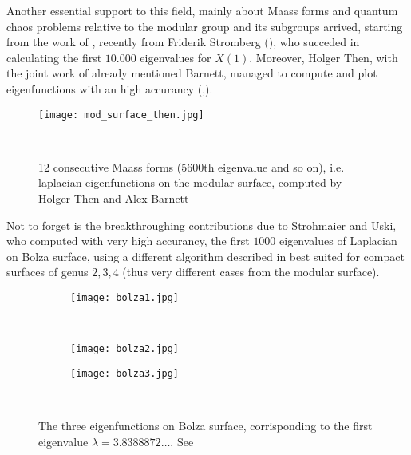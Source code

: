 Another essential support to this field, mainly about Maass forms and quantum chaos problems relative to the modular group and its subgroups arrived, starting from the work of \cite{Hejhal:triang}, recently from Friderik Stromberg (\cite{Stromb:article}), who succeded in calculating the first $10.000$ eigenvalues for $X(1)$. Moreover, Holger Then, with the joint work of already mentioned Barnett, managed to compute and plot eigenfunctions with an high accurancy (\cite{Barnett:asym_rate},\cite{Then:article}).



\begin{figure}[H]
\centering

    \texttt{[image: mod\_surface\_then.jpg]}

  \noindent\\

  \decoRule
  \caption{12 consecutive Maass forms (5600th eigenvalue and so on), i.e. laplacian eigenfunctions on the modular surface, computed by Holger Then and Alex Barnett}
  \label{fig:holg_then_eig_modul}
\end{figure}







Not to forget is the breakthroughing contributions due to Strohmaier and Uski, who computed with very high accurancy, the first $1000$ eigenvalues of Laplacian on Bolza surface, using a different algorithm described in \cite{Stroh:comput} best suited for compact surfaces of genus $2,3,4$ (thus very different cases from the modular surface).


\begin{figure}[H]
\centering
  \begin{subfigure}[b]{0.2\textwidth}
  \centering
    \texttt{[image: bolza1.jpg]}
    \label{fig:eig_bolza1}
  \end{subfigure}
  \noindent\\
  \begin{subfigure}[b]{0.2\textwidth}
  \centering
    \texttt{[image: bolza2.jpg]}
    \label{fig:eig_bolza2}
  \end{subfigure}
  \begin{subfigure}[b]{0.2\textwidth}
  \centering
    \texttt{[image: bolza3.jpg]}
    \label{fig:eig_bolza3}
  \end{subfigure}
  \noindent\\
  \decoRule
  \caption{The three eigenfunctions on Bolza surface, corrisponding to the first eigenvalue $\lambda=3.8388872\ldots$. See \cite{Stroh:comput}}
  \label{fig:first_3_bolza_eig}
\end{figure}



